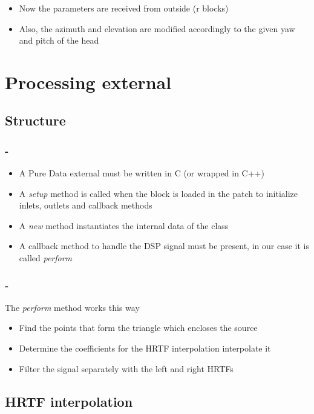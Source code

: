\documentclass{beamer}
\begin{document}
	\begin{frame}
		\frametitle{\insertsection}
		\begin{itemize}
			\item Now the parameters are received from outside (r blocks)
			\item Also, the azimuth and elevation are modified accordingly to the given yaw and pitch of
				the head
		\end{itemize}
	\end{frame}

	\section{Processing external}

	\subsection{Structure}

	\begin{frame}
		\frametitle{\insertsection - \insertsubsection}
		\begin{itemize}
			\item A Pure Data external must be written in C (or wrapped in C++)
			\item A {\em setup} method is called when the block is loaded in the patch to initialize inlets,
				outlets and callback methods
			\item A {\em new} method instantiates the internal data of the class
			\item A callback method to handle the DSP signal must be present, in our case it is called {\em perform}
		\end{itemize}
	\end{frame}

	\begin{frame}
		\frametitle{\insertsection - \insertsubsection}
		The {\em perform} method works this way
		\begin{itemize}
			\item Find the points that form the triangle which encloses the source
			\item Determine the coefficients for the HRTF interpolation interpolate it
			\item Filter the signal separately with the left and right HRTFs
		\end{itemize}
	\end{frame}

	\subsection{HRTF interpolation}
\end{document}
